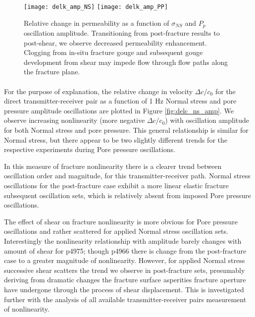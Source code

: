 \clearpage

\begin{figure}[ht]
	\centering
	\texttt{[image: delk\_amp\_NS]}
	\texttt{[image: delk\_amp\_PP]}
	\caption{Relative change in permeability as a function of $ \sigma_{NS} $ and $ P_p $ oscillation amplitude. Transitioning from post-fracture results to post-shear, we observe decreased permeability enhancement. Clogging from in-situ fracture gouge and subsequent gouge development from shear may impede flow through flow paths along the fracture plane.}%
	\label{fig:perm_ns_amp}
\end{figure}

\clearpage

\paragraph{}
For the purpose of explanation, the relative change in velocity $ \Delta c/c_0 $ for the direct transmitter-receiver pair as a function of 1 Hz Normal stress and pore pressure amplitude oscillations are plotted in Figure \ref{fig:delc_ns_amp}. We observe increasing nonlinearity (more negative $ \Delta c/c_0 $) with oscillation amplitude for both Normal stress and pore pressure. This general relationship is similar for Normal stress, but there appear to be two slightly different trends for the respective experiments during Pore pressure oscillations. 

In this measure of fracture nonlinearity there is a clearer trend between oscillation order and magnitude, for this transmitter-receiver path. Normal stress oscillations for the post-fracture case exhibit a more linear elastic fracture subsequent oscillation sets, which is relatively absent from imposed Pore pressure oscillations. 

The effect of shear on fracture nonlinearity is more obvious for Pore pressure oscillations and rather scattered for applied Normal stress oscillation sets. Interestingly the nonlinearity relationship with amplitude barely changes with amount of shear for p4975; though p4966 there is change from the post-fracture case to a greater magnitude of nonlinearity. However, for applied Normal stress successive shear scatters the trend we observe in post-fracture sets, presumably deriving from dramatic changes the fracture surface asperities fracture aperture have undergone through the process of shear displacement. This is investigated further with the analysis of all available transmitter-receiver pairs measurement of nonlinearity. 

